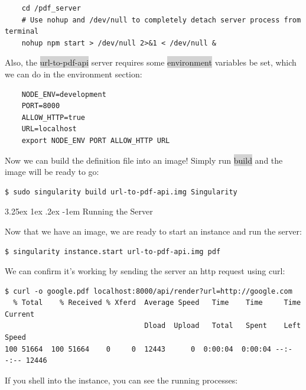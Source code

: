 \documentclass[a4paper]{article}
\makeatletter
\renewcommand\paragraph{\@startsection{paragraph}{5}{\z@}%
  {3.25ex \@plus1ex \@minus.2ex}%
  {-1em}%
  {\normalfont\normalsize\bfseries}}
\makeatother
\begin{document}
\begin{lstlisting}[frame=single]  
%startscript
    cd /pdf_server
    # Use nohup and /dev/null to completely detach server process from terminal
    nohup npm start > /dev/null 2>&1 < /dev/null &
\end{lstlisting}

    Also, the \colorbox{lightgray}{url-to-pdf-api} server requires some \colorbox{lightgray}{environment} variables be set, which we can do in the environment section:
    
\begin{lstlisting}[frame=single] 
%environment
    NODE_ENV=development
    PORT=8000
    ALLOW_HTTP=true
    URL=localhost
    export NODE_ENV PORT ALLOW_HTTP URL
\end{lstlisting}
    
    Now we can build the definition file into an image! Simply run \colorbox{lightgray}{build} and the image will be ready to go:
    
\begin{lstlisting}[frame=single]  
$ sudo singularity build url-to-pdf-api.img Singularity
\end{lstlisting}    
  
	\paragraph{Running the Server}
	
	Now that we have an image, we are ready to start an instance and run the server:
	
\begin{lstlisting}[frame=single] 
$ singularity instance.start url-to-pdf-api.img pdf 
\end{lstlisting}

	We can confirm it’s working by sending the server an http request using curl:
\begin{lstlisting}[frame=single]  
$ curl -o google.pdf localhost:8000/api/render?url=http://google.com
  % Total    % Received % Xferd  Average Speed   Time    Time     Time  Current
                                 Dload  Upload   Total   Spent    Left  Speed
100 51664  100 51664    0     0  12443      0  0:00:04  0:00:04 --:--:-- 12446
\end{lstlisting}
	
If you shell into the instance, you can see the running processes:
\end{document}
